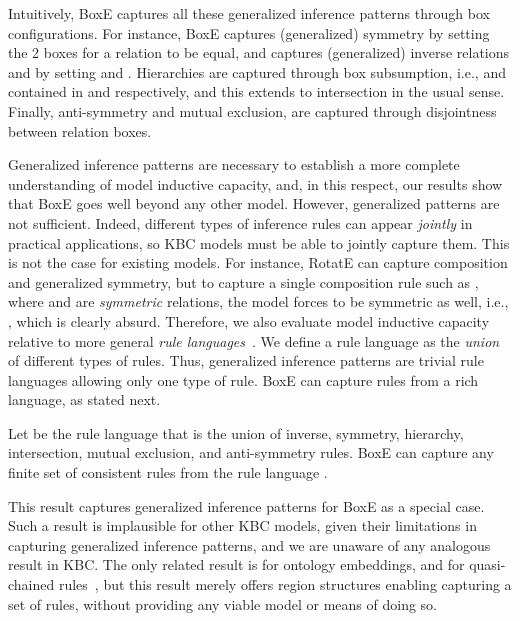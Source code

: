 \documentclass{article}
\begin{document}
Intuitively, BoxE captures all these generalized inference patterns through box configurations. For instance, BoxE captures (generalized) symmetry by setting the 2 boxes for a relation  to be equal, and captures (generalized) inverse relations  and  by setting  and . Hierarchies are captured through box subsumption, i.e.,  and  contained in  and  respectively, and this extends to intersection in the usual sense. Finally, anti-symmetry and mutual exclusion, are captured through disjointness between relation boxes.

Generalized inference patterns are necessary to establish a more complete understanding of model inductive capacity, and, in this respect,  our results show that BoxE goes well beyond any other model. However, generalized patterns are not sufficient. Indeed, different types of inference rules can appear \emph{jointly} in practical applications, so KBC models must be able to jointly capture them. This is not the case for existing models. For instance, RotatE can capture composition and generalized symmetry, but to capture a single composition rule such as , 
where  and  are \emph{symmetric} relations, the model forces  to be symmetric as well, i.e., , which is clearly absurd.
Therefore, we also evaluate model inductive capacity relative to more general \emph{rule languages}~\cite{Gutirrez18}. We define a rule language as the \emph{union} of different types of rules. Thus,  generalized inference patterns are trivial rule languages allowing only one type of rule. 
BoxE can capture rules from a rich language, as stated next.

\begin{theorem}
\label{thm:InfPat} 
Let  be the rule language that is the union of inverse, symmetry, hierarchy, intersection, mutual exclusion, and anti-symmetry rules.
BoxE can capture any finite set of consistent rules from the rule language .
\end{theorem}

This result captures generalized inference patterns for BoxE as a special case. Such a result is implausible for other KBC models, given their limitations in capturing generalized inference patterns, and we are unaware of any analogous result in KBC. The only related result is for ontology embeddings, and for quasi-chained rules~\cite{Gutirrez18}, but this result merely offers region structures enabling capturing a set of rules, without providing any viable model or means of doing so. 
\end{document}
